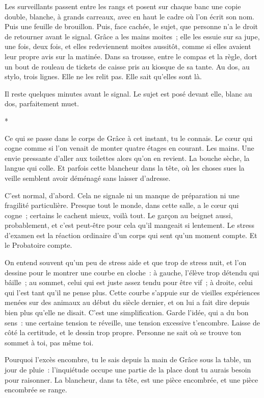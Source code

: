 \documentclass[10.5pt,twoside,openright]{book}
\newcommand{\asterisme}{\par\vspace{0.7em}\centerline{\color{gris}*\quad*\quad*}\vspace{0.7em}\par\noindent}
\begin{document}
Les surveillants passent entre les rangs et posent sur chaque banc une copie double, blanche, à grands carreaux, avec en haut le cadre où l’on écrit son nom. Puis une feuille de brouillon. Puis, face cachée, le sujet, que personne n’a le droit de retourner avant le signal. Grâce a les mains moites ; elle les essuie sur sa jupe, une fois, deux fois, et elles redeviennent moites aussitôt, comme si elles avaient leur propre avis sur la matinée. Dans sa trousse, entre le compas et la règle, dort un bout de rouleau de tickets de caisse pris au kiosque de sa tante. Au dos, au stylo, trois lignes. Elle ne les relit pas. Elle sait qu’elles sont là.

Il reste quelques minutes avant le signal. Le sujet est posé devant elle, blanc au dos, parfaitement muet.

\asterisme

Ce qui se passe dans le corps de Grâce à cet instant, tu le connais. Le cœur qui cogne comme si l’on venait de monter quatre étages en courant. Les mains. Une envie pressante d’aller aux toilettes alors qu’on en revient. La bouche sèche, la langue qui colle. Et parfois cette blancheur dans la tête, où les choses sues la veille semblent avoir déménagé sans laisser d’adresse.

C’est normal, d’abord. Cela ne signale ni un manque de préparation ni une fragilité particulière. Presque tout le monde, dans cette salle, a le cœur qui cogne ; certains le cachent mieux, voilà tout. Le garçon au beignet aussi, probablement, et c’est peut-être pour cela qu’il mangeait si lentement. Le stress d’examen est la réaction ordinaire d’un corps qui sent qu’un moment compte. Et le Probatoire compte.

On entend souvent qu’un peu de stress aide et que trop de stress nuit, et l’on dessine pour le montrer une courbe en cloche : à gauche, l’élève trop détendu qui bâille ; au sommet, celui qui est juste assez tendu pour être vif ; à droite, celui qui l’est tant qu’il ne pense plus. Cette courbe s’appuie sur de vieilles expériences menées sur des animaux au début du siècle dernier, et on lui a fait dire depuis bien plus qu’elle ne disait. C’est une simplification. Garde l’idée, qui a du bon sens : une certaine tension te réveille, une tension excessive t’encombre. Laisse de côté la certitude, et le dessin trop propre. Personne ne sait où se trouve ton sommet à toi, pas même toi.

Pourquoi l’excès encombre, tu le sais depuis la main de Grâce sous la table, un jour de pluie : l’inquiétude occupe une partie de la place dont tu aurais besoin pour raisonner. La blancheur, dans ta tête, est une pièce encombrée, et une pièce encombrée se range.
\end{document}
